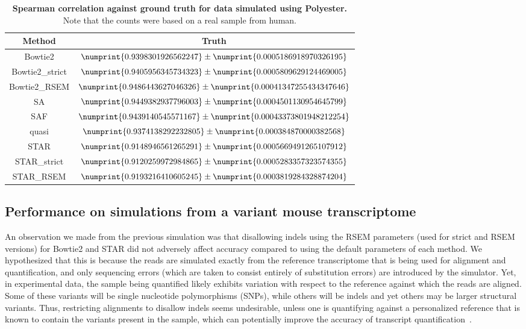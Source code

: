 \begin{table}[h!]
 \centering
 \begin{tabular}{cc}
   \hline
   Method & Truth \\
   \hline
Bowtie2 & $\numprint{0.9398301926562247} \pm \numprint{0.0005186918970326195}$ \\
Bowtie2\_strict & $\numprint{0.9405956345734323} \pm \numprint{0.0005809629124469005}$ \\
Bowtie2\_RSEM & $\numprint{0.9486443627046326} \pm \numprint{0.00041347255434347646}$ \\
SA & $\numprint{0.9449382937796003} \pm \numprint{0.0004501130954645799}$ \\
SAF & $\numprint{0.9439140545571167} \pm \numprint{0.00043373801948212254}$ \\
quasi & $\numprint{0.9374138292232805} \pm \numprint{0.000384870000382568}$ \\
STAR & $\numprint{0.9148946561265291} \pm \numprint{0.0005669491265107912}$ \\
STAR\_strict & $\numprint{0.9120259972984865} \pm \numprint{0.0005283357323574355}$ \\
STAR\_RSEM & $\numprint{0.9193216410605245} \pm \numprint{0.0003819284328874204}$ \\
 \hline
\end{tabular}
 \caption{\textbf{Spearman correlation against ground truth for data simulated using Polyester.} Note that the
 counts were based on a real sample from human.}
 \label{tab:swim}
\end{table}


\subsection{Performance on simulations from a variant mouse transcriptome}
\label{subsec:variant_sim}

An observation we made from the previous simulation was that disallowing
indels using the RSEM parameters (used for strict and RSEM versions) for Bowtie2 and STAR 
did not adversely affect accuracy compared to using the default parameters of each method.
We hypothesized that this is because the reads are simulated exactly from the
reference transcriptome that is being used for alignment and quantification, and
only sequencing errors (which are taken to consist entirely of substitution
errors) are introduced by the simulator. Yet, in experimental data,
the sample being quantified likely exhibits variation with respect to the
reference against which the reads are aligned. Some of these variants will be
single nucleotide polymorphisms (SNPs), while others will be indels and yet
others may be larger structural variants. Thus, restricting alignments to disallow
indels seems undesirable, unless one is quantifying
against a personalized reference that is known to contain the variants present
in the sample, which can potentially improve the accuracy of transcript
quantification~\citep{munger2014rna, makemickhappy}.

